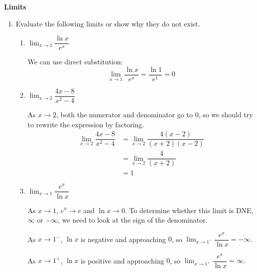 \documentclass{article}
\begin{document}

{\large\textbf{Limits}}
  
\begin{enumerate}
 
    \item Evaluate the following limits or show why they do not exist.
    \begin{enumerate}
        \item $\displaystyle\lim_{x\to 1} \dfrac{\ln x}{e^x}$
        
        \begin{solution}
            We can use direct substitution:
            \[\displaystyle\lim_{x\to 1} \dfrac{\ln x}{e^x}=\dfrac{\ln 1}{e^1}=\boxed{0}\]
        \end{solution}
        \probonly{\vfill}
        
        \item $\displaystyle\lim_{x\to 2} \dfrac{4x-8}{x^2-4}$
        
        \begin{solution}
            As $x\to 2$, both the numerator and denominator go to $0$, so we should try to rewrite the expression by factoring.
            \begin{align*}
                \displaystyle\lim_{x\to 2} \dfrac{4x-8}{x^2-4} &= \displaystyle\lim_{x\to 2} \dfrac{4(x-2)}{(x+2)(x-2)}\\
                &= \displaystyle\lim_{x\to 2} \dfrac{4}{(x+2)}\\
                &= \boxed{1}
            \end{align*}
        \end{solution}
        \probonly{\vfill}
        
        \item $\displaystyle\lim_{x\to 1} \dfrac{e^x}{\ln x}$

        \begin{solution}
            As $x\to 1$, $e^x \to e$ and $\ln x \to 0$. To determine whether this limit is DNE, $\infty$ or $-\infty$, we need to look at the sign of the denominator. 
            
            As $x\to 1^-$, $\ln x$ is negative and approaching $0$, so $\displaystyle\lim_{x\to 1^-}\dfrac{e^x}{\ln x}=-\infty$. 

            As $x\to 1^+$, $\ln x$ is positive and approaching $0$, so $\displaystyle\lim_{x\to 1^+}\dfrac{e^x}{\ln x}=\infty$. 


\end{solution}
\end{enumerate}
\end{enumerate}
\end{document}
